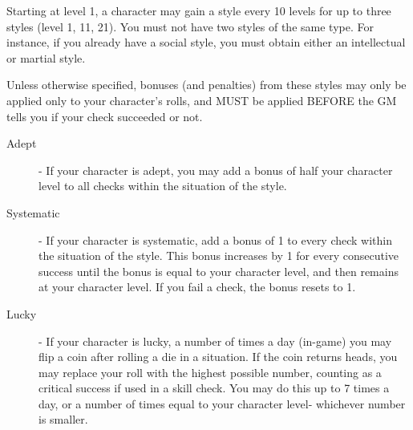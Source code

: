 Starting at level 1, a character may gain a style every 10 levels for up to three styles (level 1, 11, 21). You must not have two styles of the same type. For instance, if you already have a social style, you must obtain either an intellectual or martial style.

Unless otherwise specified, bonuses (and penalties) from these styles may only be applied only to your character's rolls, and MUST be applied BEFORE the GM tells you if your check succeeded or not.

\begin{description}
\item[Adept] - If your character is adept, you may add a bonus of half your character level to all checks within the situation of the style.
\item[Systematic] - If your character is systematic, add a bonus of 1 to every check within the situation of the style. This bonus increases by 1 for every consecutive success until the bonus is equal to your character level, and then remains at your character level. If you fail a check, the bonus resets to 1.
\item[Lucky] - If your character is lucky, a number of times a day (in-game) you may flip a coin after rolling a die in a situation. If the coin returns heads, you may replace your roll with the highest possible number, counting as a critical success if used in a skill check. You may do this up to 7 times a day, or a number of times equal to your character level- whichever number is smaller.


\end{description}
